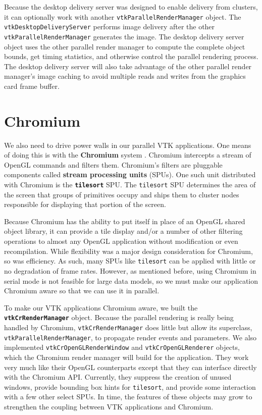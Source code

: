 \documentclass[letterpaper]{acmsiggraph}
\newcommand{\cidentifier}[1]{\texttt{#1}}
\newcommand{\keyterm}[1]{\textbf{#1}}
\begin{document}
  Because the desktop delivery server was designed to enable delivery from
  clusters, it can optionally work with another
  \cidentifier{vtk\-Parallel\-Render\-Manager} object.  The
  \cidentifier{vtk\-Desktop\-Delivery\-Server} performs image delivery
  after the other \cidentifier{vtk\-Parallel\-Render\-Manager} generates
  the image.  The desktop delivery server object uses the other parallel
  render manager to compute the complete object bounds, get timing
  statistics, and otherwise control the parallel rendering process.  The
  desktop delivery server will also take advantage of the other parallel
  render manager's image caching to avoid multiple reads and writes from
  the graphics card frame buffer.


  \section{Chromium}
  \label{sec:chromium}

  We also need to drive power walls in our parallel VTK applications.  One
  means of doing this is with the \keyterm{Chromium} system
  \cite{Humphreys02}.  Chromium intercepts a stream of OpenGL commands and
  filters them.  Chromium's filters are pluggable components called
  \keyterm{stream processing units} (SPUs).  One such unit distributed with
  Chromium is the \keyterm{\cidentifier{tile\-sort}} SPU.  The
  \cidentifier{tile\-sort} SPU determines the area of the screen that
  groups of primitives occupy and ships them to cluster nodes responsible
  for displaying that portion of the screen.

  Because Chromium has the ability to put itself in place of an OpenGL
  shared object library, it can provide a tile display and/or a number of
  other filtering operations to almost any OpenGL application without
  modification or even recompilation.  While flexibility was a major design
  consideration for Chromium, so was efficiency.  As such, many SPUs like
  \cidentifier{tile\-sort} can be applied with little or no degradation of
  frame rates.  However, as mentioned before, using Chromium in serial mode
  is not feasible for large data models, so we must make our application
  Chromium aware so that we can use it in parallel.

  To make our VTK applications Chromium aware, we built the
  \keyterm{\cidentifier{vtk\-Cr\-Render\-Manager}} object.  Because the
  parallel rendering is really being handled by Chromium,
  \cidentifier{vtk\-Cr\-Render\-Manager} does little but allow its
  superclass, \cidentifier{vtk\-Parallel\-Render\-Manager}, to propagate
  render events and parameters.  We also implemented
  \cidentifier{vtk\-Cr\-Open\-GL\-Render\-Window} and
  \cidentifier{vtk\-Cr\-Open\-GL\-Renderer} objects, which the Chromium
  render manager will build for the application.  They work very much like
  their OpenGL counterparts except that they can interface directly with
  the Chromium API.  Currently, they suppress the creation of unused
  windows, provide bounding box hints for \cidentifier{tile\-sort}, and
  provide some interaction with a few other select SPUs.  In time, the
  features of these objects may grow to strengthen the coupling between VTK
  applications and Chromium.
\end{document}
